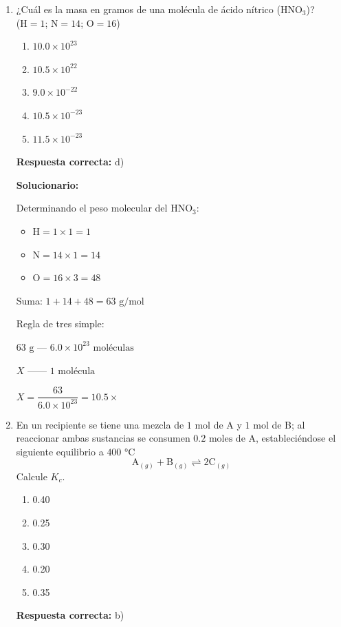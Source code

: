 \begin{enumerate}[resume]

	\item ¿Cuál es la masa en gramos de una molécula de ácido nítrico ($\text{HNO}_3$)?\\
	($\text{H}=1$; $\text{N}=14$; $\text{O}=16$)
	\begin{enumerate}[label=\alph*)]
		\item $10.0 \times 10^{23}$
		\item $10.5 \times 10^{22}$
		\item $9.0 \times 10^{-22}$
		\item $10.5 \times 10^{-23}$
		\item $11.5 \times 10^{-23}$
	\end{enumerate}
	\textbf{Respuesta correcta:} d)

	\vspace{2mm}
	\textbf{Solucionario:}

	Determinando el peso molecular del $\text{HNO}_3$:

	\begin{itemize}
		\item $\text{H} = 1 \times 1 = 1$
		\item $\text{N} = 14 \times 1 = 14$
		\item $\text{O} = 16 \times 3 = 48$
	\end{itemize}
	Suma: $1 + 14 + 48 = 63\text{ g/mol}$

	Regla de tres simple:

	$63\text{ g} \text{ --- } 6.0 \times 10^{23} \text{ moléculas} $

	$ X \text{ ------ } 1 \text{ molécula} $

	$X = \dfrac{63}{6.0 \times 10^{23}} = 10.5 \times $ 

	\vspace{6mm}

	\item En un recipiente se tiene una mezcla de $1\text{ mol}$ de A y $1\text{ mol}$ de B; al reaccionar ambas sustancias se consumen $0.2\text{ moles}$ de A, estableciéndose el siguiente equilibrio a $400\text{ °C}$
	\[ \text{A}_{(g)} + \text{B}_{(g)} \rightleftharpoons 2\text{C}_{(g)} \]
	Calcule $K_c$.
	\begin{enumerate}[label=\alph*)]
		\item 0.40
		\item 0.25
		\item 0.30
		\item 0.20
		\item 0.35
	\end{enumerate}
	\textbf{Respuesta correcta:} b)


\end{enumerate}
